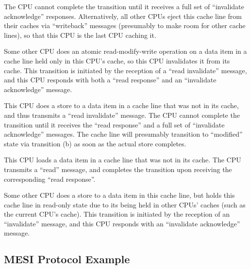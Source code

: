 \begin{description}[style=nextline]
	The CPU cannot complete the transition until it receives a full
	set of ``invalidate acknowledge'' responses.
	Alternatively, all other CPUs eject this cache line from
	their caches via ``writeback'' messages (presumably to make room
	for other cache lines),
	so that this CPU is the last CPU caching it.
\item	[Transition (i):]
	Some other CPU does an atomic read-modify-write operation on
	a data item in a cache line held only in this CPU's cache,
	so this CPU invalidates it from its cache.
	This transition is initiated by the reception of a ``read invalidate''
	message, and this CPU responds with both a ``read response''
	and an ``invalidate acknowledge'' message.
\item	[Transition (j):]
	This CPU does a store to a data item in a cache line that was not
	in its cache, and thus transmits a ``read invalidate'' message.
	The CPU cannot complete the transition until it receives the
	``read response'' and a full set of ``invalidate acknowledge''
	messages.
	The cache line will presumably transition to ``modified'' state via
	transition (b) as soon as the actual store completes.
\item	[Transition (k):]
	This CPU loads a data item in a cache line that was not
	in its cache.
	The CPU transmits a ``read'' message, and completes the
	transition upon receiving the corresponding ``read response''.
\item	[Transition (l):]
	Some other CPU does a store to
	a data item in this cache line, but holds this cache line in read-only
	state due to its being held in other CPUs' caches (such as the
	current CPU's cache).
	This transition is initiated by the reception of an ``invalidate''
	message, and this CPU responds with
	an ``invalidate acknowledge'' message.
\end{description}

\QuickQuizEnd

\subsection{MESI Protocol Example}
\label{sec:app:whymb:MESI Protocol Example}

